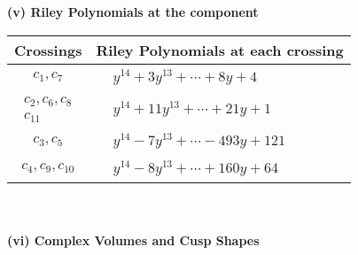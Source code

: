 \documentclass[1p]{elsarticle_modified}
\theoremstyle{definition}
\begin{document}
\newpage\renewcommand{\arraystretch}{1}
\flushleft \textbf{(v) Riley Polynomials at the component}\newline \\
\begin{tabular}{m{50pt}|m{274pt}}
Crossings & \hspace{64pt}Riley Polynomials at each crossing \\
\hline $$\begin{aligned}c_{1},c_{7}\end{aligned}$$&$\begin{aligned}
&y^{14}+3 y^{13}+\cdots+8 y+4
\end{aligned}$\\
\hline $$\begin{aligned}c_{2},c_{6},c_{8}\\c_{11}\end{aligned}$$&$\begin{aligned}
&y^{14}+11 y^{13}+\cdots+21 y+1
\end{aligned}$\\
\hline $$\begin{aligned}c_{3},c_{5}\end{aligned}$$&$\begin{aligned}
&y^{14}-7 y^{13}+\cdots-493 y+121
\end{aligned}$\\
\hline $$\begin{aligned}c_{4},c_{9},c_{10}\end{aligned}$$&$\begin{aligned}
&y^{14}-8 y^{13}+\cdots+160 y+64
\end{aligned}$\\
\hline
\end{tabular}\\~\\
\newpage\flushleft \textbf{(vi) Complex Volumes and Cusp Shapes}
\end{document}
